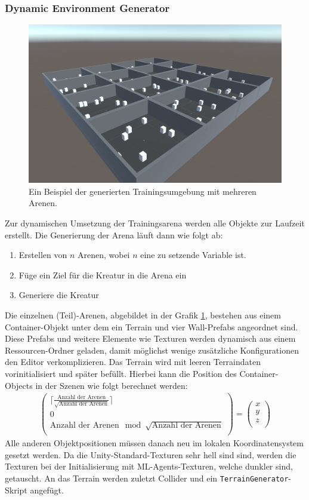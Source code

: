\subsubsection{Dynamic Environment Generator}
\begin{figure}
	\centering
	\includegraphics[width=0.7\linewidth]{resources/img/DEGArenen}
	\caption[Beispiel der generierten Trainingsumgebung]{Ein Beispiel der generierten Trainingsumgebung mit mehreren Arenen.}
	\label{bspArena}
\end{figure}
Zur dynamischen Umsetzung der Trainingsarena werden alle Objekte zur Laufzeit erstellt. Die Generierung der Arena läuft dann wie folgt ab:
\begin{enumerate}
	\item Erstellen von $n$ Arenen, wobei $n$ eine zu setzende Variable ist. 
	\item Füge ein Ziel für die Kreatur in die Arena ein
	\item Generiere die Kreatur
\end{enumerate} 
Die einzelnen (Teil)-Arenen, abgebildet in der Grafik \ref{bspArena}, bestehen aus einem Container-Objekt unter dem ein Terrain und vier Wall-Prefabs angeordnet sind. Diese Prefabs und weitere Elemente wie Texturen werden dynamisch aus einem Ressourcen-Ordner geladen, damit möglichst wenige zusätzliche Konfigurationen den Editor verkomplizieren. Das Terrain wird mit leeren Terraindaten vorinitialisiert und später befüllt. Hierbei kann die Position des Container-Objects in der Szenen wie folgt berechnet werden:
\begin{align}
	\begin{pmatrix}
	\lceil \frac{\text{Anzahl der Arenen}}{\sqrt{\text{Anzahl der Arenen}}} \rceil \\
	0 \\
	\text{Anzahl der Arenen} \mod \sqrt{\text{Anzahl der Arenen}} \\
	\end{pmatrix}
	 = 	\begin{pmatrix}
	 x  \\
	 y \\
	 z  \\
	 \end{pmatrix}
\end{align}
Alle anderen Objektpositionen müssen danach neu im lokalen Koordinatensystem gesetzt werden. Da die Unity-Standard-Texturen sehr hell sind sind, werden die Texturen bei der Initialisierung mit ML-Agents-Texturen, welche dunkler sind, getauscht. An das Terrain werden zuletzt Collider und ein \texttt{TerrainGenerator}-Skript angefügt. 

